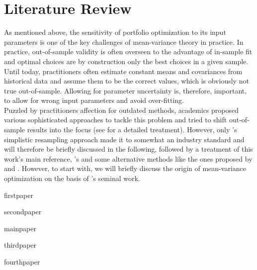 \section{Literature Review}
As mentioned above, the sensitivity of portfolio optimization to its input parameters is one of the key challenges of mean-variance theory in practice. In practice, out-of-sample validity is often overseen to the advantage of in-sample fit and optimal choices are by construction only the best choices in a given sample. Until today, practitioners often estimate constant means and covariances from historical data and assume them to be the correct values, which is obviously not true out-of-sample. Allowing for parameter uncertainty is, therefore, important, to allow for wrong input parameters and avoid over-fitting.\\
Puzzled by practitioners affection for outdated methods, academics proposed various sophisticated approaches to tackle this problem and tried to shift out-of-sample results into the focus (see \cite{albrecher_runggaldier_schachermayer_2009} for a detailed treatment). However, only \citeauthor{michaud_2007}'s simplistic resampling approach made it to somewhat an industry standard and will therefore be briefly discussed in the following, followed by a treatment of this work's main reference, \citeauthor{anderson_cheng_2016}'s  and some alternative methods like the ones proposed by \cite{ceria_stubbs_2006} and \cite{tütüncü_koenig_2004}. However, to start with, we will briefly discuss the origin of mean-variance optimization on the basis of \citeauthor{markowitz_1952}'s seminal work.

{firstpaper}

{secondpaper}

{mainpaper}

{thirdpaper}

{fourthpaper}
